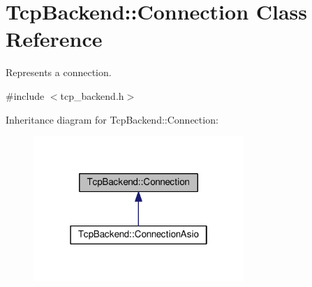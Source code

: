 \hypertarget{classTcpBackend_1_1Connection}{}\section{Tcp\+Backend\+:\+:Connection Class Reference}
\label{classTcpBackend_1_1Connection}


Represents a connection.  




{\ttfamily \#include $<$tcp\+\_\+backend.\+h$>$}



Inheritance diagram for Tcp\+Backend\+:\+:Connection\+:
\nopagebreak
\begin{figure}[H]
\begin{center}
\leavevmode
\includegraphics[width=226pt]{classTcpBackend_1_1Connection__inherit__graph}
\end{center}
\end{figure}
